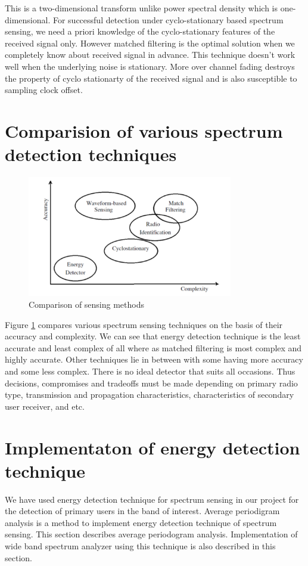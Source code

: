 This is a two-dimensional transform unlike power spectral density which is 
one-dimensional. For successful detection under cyclo-stationary based spectrum 
sensing, we need a priori knowledge of the cyclo-stationary features of the 
received signal only. However matched filtering is the optimal solution when we 
completely know about received signal in advance.
This technique doesn't work well when the underlying noise is stationary. More 
over channel fading destroys the property of cyclo stationarty of the received 
signal and is also susceptible to sampling clock offset. 


\section{Comparision of various spectrum detection techniques}


\begin{figure}[h]
\centering
\includegraphics[width=0.8\textwidth]{../images/compareSensing}
\caption[Comparison of sensing methods]{Comparison of sensing methods}
\label{compareSensing}
\end{figure}
Figure \ref{compareSensing} compares various spectrum sensing techniques on
the basis of their 
accuracy and complexity. We can see that energy detection technique is the least
accurate and least complex of all where as matched filtering is most complex and
highly accurate. Other techniques lie in between with some having more accuracy 
and some less complex. There is no ideal detector that suits all occasions. Thus
decisions, compromises and tradeoffs must be made depending on primary radio 
type, transmission and propagation characteristics, characteristics of secondary
user receiver, and etc\cite{akyildiz06}.

\section{Implementaton of energy detection technique}
We have used energy detection technique for spectrum sensing in our project for 
the detection of primary users in the band of interest. Average periodigram 
analysis is a method to implement energy detection technique of spectrum 
sensing. This section describes average periodogram analysis.  Implementation of
wide band spectrum analyzer using this technique is also described in this 
section.

